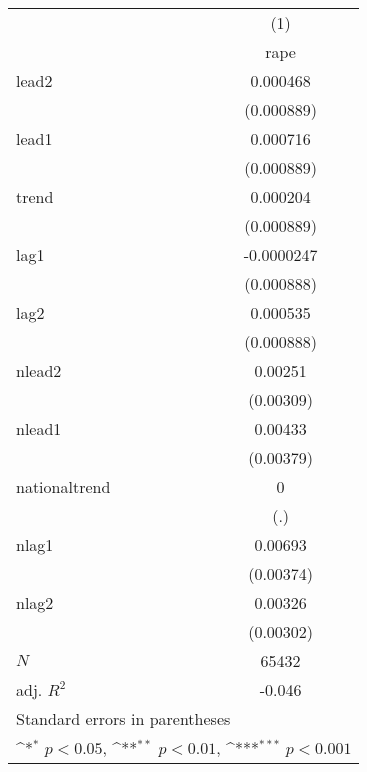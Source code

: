 {
\def\sym#1{\ifmmode^{#1}\else\(^{#1}\)\fi}
\begin{tabular}{l*{1}{c}}
\hline\hline
            &\multicolumn{1}{c}{(1)}\\
            &\multicolumn{1}{c}{rape}\\
\hline
lead2       &    0.000468         \\
            &  (0.000889)         \\
[1em]
lead1       &    0.000716         \\
            &  (0.000889)         \\
[1em]
trend       &    0.000204         \\
            &  (0.000889)         \\
[1em]
lag1        &  -0.0000247         \\
            &  (0.000888)         \\
[1em]
lag2        &    0.000535         \\
            &  (0.000888)         \\
[1em]
nlead2      &     0.00251         \\
            &   (0.00309)         \\
[1em]
nlead1      &     0.00433         \\
            &   (0.00379)         \\
[1em]
nationaltrend&           0         \\
            &         (.)         \\
[1em]
nlag1       &     0.00693         \\
            &   (0.00374)         \\
[1em]
nlag2       &     0.00326         \\
            &   (0.00302)         \\
\hline
\(N\)       &       65432         \\
adj. \(R^{2}\)&      -0.046         \\
\hline\hline
\multicolumn{2}{l}{\footnotesize Standard errors in parentheses}\\
\multicolumn{2}{l}{\footnotesize \sym{*} \(p<0.05\), \sym{**} \(p<0.01\), \sym{***} \(p<0.001\)}\\
\end{tabular}
}
